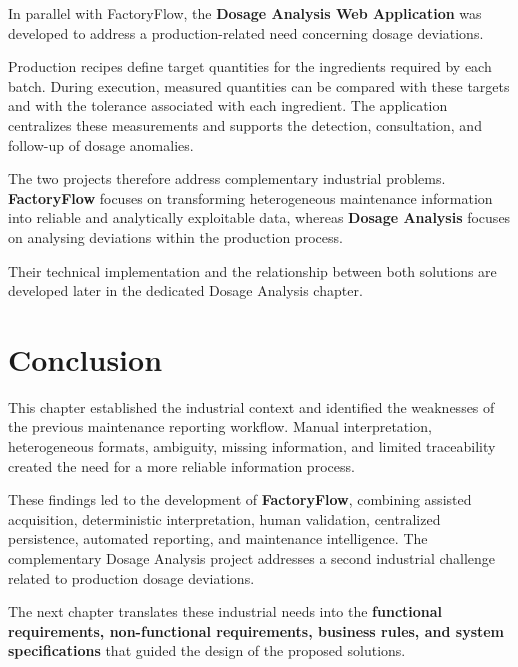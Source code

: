 In parallel with FactoryFlow, the \textbf{Dosage Analysis Web Application} was developed to address a production-related need concerning dosage deviations.

Production recipes define target quantities for the ingredients required by each batch. During execution, measured quantities can be compared with these targets and with the tolerance associated with each ingredient. The application centralizes these measurements and supports the detection, consultation, and follow-up of dosage anomalies.

The two projects therefore address complementary industrial problems. \textbf{FactoryFlow} focuses on transforming heterogeneous maintenance information into reliable and analytically exploitable data, whereas \textbf{Dosage Analysis} focuses on analysing deviations within the production process.

Their technical implementation and the relationship between both solutions are developed later in the dedicated Dosage Analysis chapter.



\section{Conclusion}
\label{sec:chapter1-conclusion}

This chapter established the industrial context and identified the weaknesses of the previous maintenance reporting workflow. Manual interpretation, heterogeneous formats, ambiguity, missing information, and limited traceability created the need for a more reliable information process.

These findings led to the development of \textbf{FactoryFlow}, combining assisted acquisition, deterministic interpretation, human validation, centralized persistence, automated reporting, and maintenance intelligence. The complementary Dosage Analysis project addresses a second industrial challenge related to production dosage deviations.

The next chapter translates these industrial needs into the \textbf{functional requirements, non-functional requirements, business rules, and system specifications} that guided the design of the proposed solutions.
